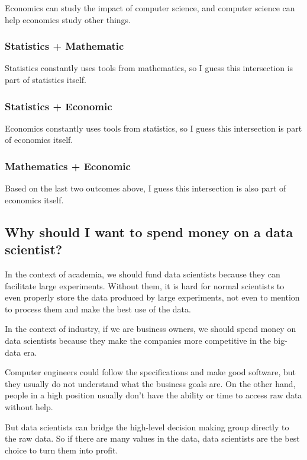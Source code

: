 Economics can study the impact of computer science, and computer science can help economics study other things.

\subsubsection*{Statistics + Mathematic}

Statistics constantly uses tools from mathematics, so I guess this intersection is part of statistics itself.

\subsubsection*{Statistics + Economic}

Economics constantly uses tools from statistics, so I guess this intersection is part of economics itself.

\subsubsection*{Mathematics + Economic}

Based on the last two outcomes above, I guess this intersection is also part of economics itself.

\newpage
\subsection*{Why should I want to spend money on a data scientist?}

In the context of academia, we should fund data scientists because they can facilitate large experiments.
Without them, it is hard for normal scientists to even properly store the data produced by large experiments, not even to mention to process them and make the best use of the data.

In the context of industry, if we are business owners, we should spend money on data scientists because they make the companies more competitive in the big-data era.

Computer engineers could follow the specifications and make good software, but they usually do not understand what the business goals are.
On the other hand, people in a high position usually don't have the ability or time to access raw data without help.

But data scientists can bridge the high-level decision making group directly to the raw data.
So if there are many values in the data, data scientists are the best choice to turn them into profit.




